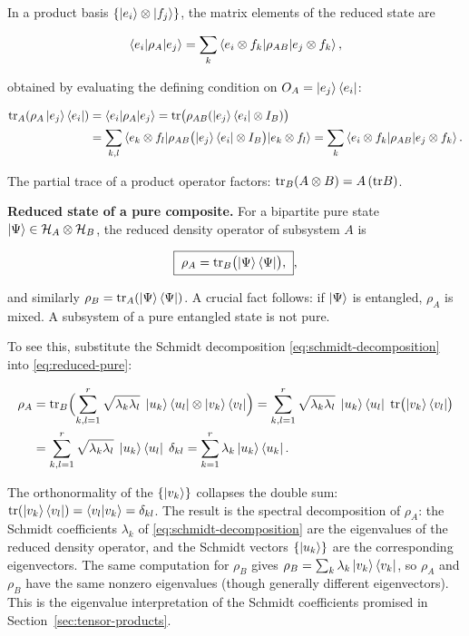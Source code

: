 In a product basis $\{\ket{e_i} \otimes \ket{f_j}\}$, the matrix elements of the reduced state are
\begin{linenomath}
\begin{equation}
\braket{e_i|\rho_A|e_j}
= \sum_k \braket{e_i \otimes f_k|\rho_{AB}|e_j \otimes f_k},
\label{eq:partial-trace-matrix}
\end{equation}
\end{linenomath}
obtained by evaluating the defining condition on $O_A = \ket{e_j}\bra{e_i}$:
\begin{linenomath}
\begin{align}
\mathrm{tr}_A(\rho_A\ket{e_j}\bra{e_i})
&= \braket{e_i|\rho_A|e_j}
= \mathrm{tr}\bigl(\rho_{AB}(\ket{e_j}\bra{e_i} \otimes I_B)\bigr) \\
&= \sum_{k,l} \braket{e_k\otimes f_l|\rho_{AB}\bigl(\ket{e_j}\bra{e_i} \otimes I_B\bigr)|e_k\otimes f_l}
= \sum_k \braket{e_i\otimes f_k|\rho_{AB}|e_j\otimes f_k}.
\end{align}
\end{linenomath}
The partial trace of a product operator factors: $\mathrm{tr}_B(A \otimes B) = A \, (\mathrm{tr} B)$.

\medskip\noindent\textbf{Reduced state of a pure composite.}
For a bipartite pure state $\ket{\Psi} \in \mathcal{H}_A \otimes \mathcal{H}_B$, the reduced density operator of subsystem $A$ is
\begin{linenomath}
\begin{equation}
\boxed{\;
\rho_A = \mathrm{tr}_B\bigl(\ket{\Psi}\bra{\Psi}\bigr),
\;},
\label{eq:reduced-pure}
\end{equation}
\end{linenomath}
and similarly $\rho_B = \mathrm{tr}_A(\ket{\Psi}\bra{\Psi})$. A crucial fact follows: if $\ket{\Psi}$ is entangled, $\rho_A$ is mixed. A subsystem of a pure entangled state is not pure.

To see this, substitute the Schmidt decomposition \eqref{eq:schmidt-decomposition} into \eqref{eq:reduced-pure}:
\begin{linenomath}
\begin{align}
\rho_A &= \mathrm{tr}_B\Bigl(\sum_{k,l=1}^{r} \sqrt{\lambda_k\lambda_l}\;
\ket{u_k}\bra{u_l} \otimes \ket{v_k}\bra{v_l}\Bigr)
= \sum_{k,l=1}^{r} \sqrt{\lambda_k\lambda_l}\;
\ket{u_k}\bra{u_l} \; \mathrm{tr}\bigl(\ket{v_k}\bra{v_l}\bigr) \\
&= \sum_{k,l=1}^{r} \sqrt{\lambda_k\lambda_l}\;
\ket{u_k}\bra{u_l} \; \delta_{kl}
= \sum_{k=1}^{r} \lambda_k \ket{u_k}\bra{u_k}.
\end{align}
\end{linenomath}
The orthonormality of the $\{\ket{v_k}\}$ collapses the double sum: $\mathrm{tr}(\ket{v_k}\bra{v_l}) = \braket{v_l|v_k} = \delta_{kl}$. The result is the spectral decomposition of $\rho_A$: the Schmidt coefficients $\lambda_k$ of \eqref{eq:schmidt-decomposition} are the eigenvalues of the reduced density operator, and the Schmidt vectors $\{\ket{u_k}\}$ are the corresponding eigenvectors. The same computation for $\rho_B$ gives $\rho_B = \sum_k \lambda_k \ket{v_k}\bra{v_k}$, so $\rho_A$ and $\rho_B$ have the same nonzero eigenvalues (though generally different eigenvectors). This is the eigenvalue interpretation of the Schmidt coefficients promised in Section~\ref{sec:tensor-products}.

